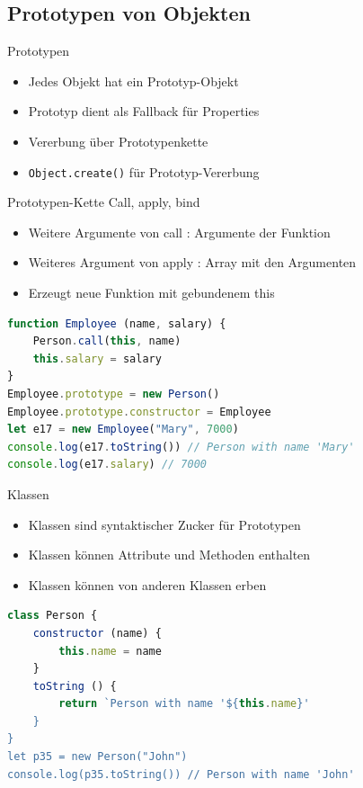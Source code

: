 \subsection{Prototypen von Objekten}

\begin{concept}{Prototypen}
    \begin{itemize}
        \item Jedes Objekt hat ein Prototyp-Objekt
        \item Prototyp dient als Fallback für Properties
        \item Vererbung über Prototypenkette
        \item \texttt{Object.create()} für Prototyp-Vererbung
    \end{itemize}
\end{concept}

\begin{concept}{Prototypen-Kette}
    Call, apply, bind
    \begin{itemize}
        \item Weitere Argumente von call : Argumente der Funktion
        \item Weiteres Argument von apply : Array mit den Argumenten
        \item Erzeugt neue Funktion mit gebundenem this
    \end{itemize}
\begin{lstlisting}[language=JavaScript, style=basesmol]
function Employee (name, salary) {
    Person.call(this, name)
    this.salary = salary
}
Employee.prototype = new Person()
Employee.prototype.constructor = Employee
let e17 = new Employee("Mary", 7000)
console.log(e17.toString()) // Person with name 'Mary' 
console.log(e17.salary) // 7000 
\end{lstlisting}
\end{concept}

\begin{definition}{Klassen}
    \begin{itemize}
        \item Klassen sind syntaktischer Zucker für Prototypen
        \item Klassen können Attribute und Methoden enthalten
        \item Klassen können von anderen Klassen erben
    \end{itemize}
\begin{lstlisting}[language=JavaScript, style=basesmol]
class Person {
    constructor (name) {
        this.name = name
    }
    toString () {
        return `Person with name '${this.name}'
    }
}
let p35 = new Person("John")
console.log(p35.toString()) // Person with name 'John'
\end{lstlisting}
\end{definition}

